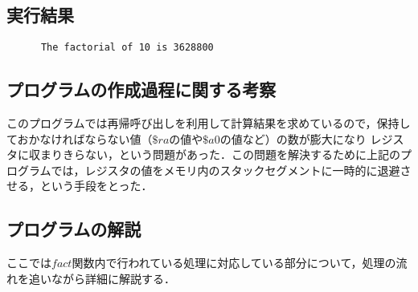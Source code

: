 \documentclass[a4j,11pt]{jarticle}
\begin{document}
\subsection{実行結果}

\begin{verbatim}
      The factorial of 10 is 3628800      
\end{verbatim}

\subsection{プログラムの作成過程に関する考察}

このプログラムでは再帰呼び出しを利用して計算結果を求めているので，保持しておかなければならない値（$\$ra$の値や$\$a0$の値など）の数が膨大になり
レジスタに収まりきらない，という問題があった．この問題を解決するために上記のプログラムでは，レジスタの値をメモリ内のスタックセグメントに一時的に退避させる，という手段をとった．

\subsection{プログラムの解説}
ここでは$fact$関数内で行われている処理に対応している部分について，処理の流れを追いながら詳細に解説する．
\end{document}
